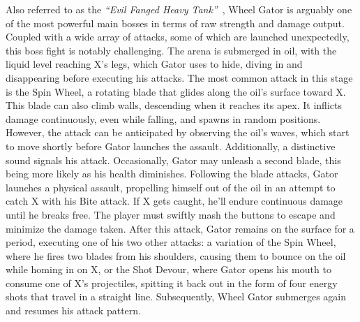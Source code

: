 Also referred to as the \textit{``Evil Fanged Heavy Tank''}~\cite{book:MMX_Complete_art}, Wheel Gator is arguably one of the most powerful main bosses in terms of raw strength and damage output. Coupled with a wide array of attacks, some of which are launched unexpectedly, this boss fight is notably challenging. The arena is submerged in oil, with the liquid level reaching X's legs, which Gator uses to hide, diving in and disappearing before executing his attacks. The most common attack in this stage is the Spin Wheel, a rotating blade that glides along the oil's surface toward X. This blade can also climb walls, descending when it reaches its apex. It inflicts damage continuously, even while falling, and spawns in random positions. However, the attack can be anticipated by observing the oil's waves, which start to move shortly before Gator launches the assault. Additionally, a distinctive sound signals his attack.
Occasionally, Gator may unleash a second blade, this being more likely as his health diminishes. Following the blade attacks, Gator launches a physical assault, propelling himself out of the oil in an attempt to catch X with his Bite attack. If X gets caught, he'll endure continuous damage until he breaks free. The player must swiftly mash the buttons to escape and minimize the damage taken. After this attack, Gator remains on the surface for a period, executing one of his two other attacks: a variation of the Spin Wheel, where he fires two blades from his shoulders, causing them to bounce on the oil while homing in on X, or the Shot Devour, where Gator opens his mouth to consume one of X's projectiles, spitting it back out in the form of four energy shots that travel in a straight line. Subsequently, Wheel Gator submerges again and resumes his attack pattern.
